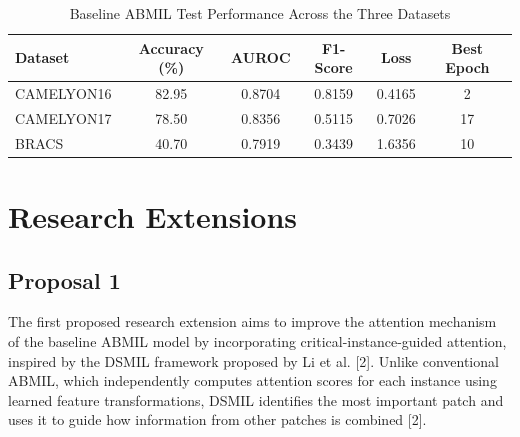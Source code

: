 \documentclass[journal]{IEEEtran}
\begin{document}
\begin{table}[htbp]
    \centering
    \label{tab:baseline_results}
    \caption {Baseline ABMIL Test Performance Across the Three Datasets}
    \begin{tabular}{|l|c|c|c|c|c|}
        \hline
        \textbf{Dataset} & \textbf{Accuracy (\%)} & \textbf{AUROC} & \textbf{F1-Score} & \textbf{Loss} & \textbf{Best Epoch} \\
        \hline
        CAMELYON16 & 82.95 & 0.8704 & 0.8159 & 0.4165 & 2 \\
        \hline
        CAMELYON17 & 78.50 & 0.8356 & 0.5115 & 0.7026 & 17 \\
        \hline
        BRACS & 40.70 & 0.7919 & 0.3439 & 1.6356 & 10 \\
        \hline
    \end{tabular} 
\end{table}


\section{Research Extensions}

\subsection{Proposal 1}
The first proposed research extension aims to improve the attention mechanism of the baseline ABMIL model by incorporating critical-instance-guided attention, inspired by the DSMIL framework proposed by Li et al. [2]. Unlike conventional ABMIL, which independently computes attention scores for each instance using learned feature transformations, DSMIL identifies the most important patch and uses it to guide how information from other patches is combined [2].
\end{document}
